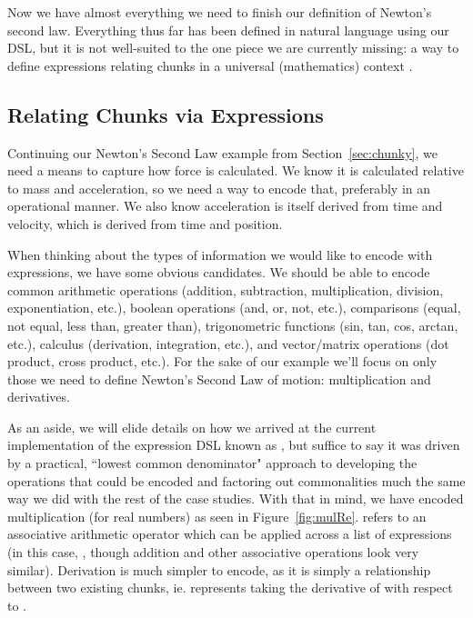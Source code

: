 Now we have almost everything we need to finish our definition of Newton's 
second law. Everything thus far has been defined in natural language using our 
 DSL, but it is not well-suited to the one piece we are 
currently missing: a way to define expressions relating chunks in a universal 
 (mathematics) context .

\subsection{Relating Chunks via Expressions}
\label{sec:expr}

Continuing our Newton's Second Law example from Section~\ref{sec:chunky}, we 
need a means to capture how force is calculated. We know it is calculated 
relative to mass and acceleration, so we need a way to encode that, preferably 
in an operational manner. We also know acceleration is itself derived from 
time and velocity, which is derived from time and position.

When thinking about the types of information we would like to encode with 
expressions, we have some obvious candidates. We should be able to encode 
common arithmetic operations (addition, subtraction, multiplication, division, 
exponentiation, etc.), boolean operations (and, or, not, etc.), comparisons 
(equal, not equal, less than, greater than), trigonometric functions (sin, tan, 
cos, arctan, etc.), calculus (derivation, integration, etc.), and vector/matrix 
operations (dot product, cross product, etc.). For the sake of our example 
we'll focus on only those we need to define Newton's Second Law of motion: 
multiplication and derivatives.


As an aside, we will elide details on how we arrived at the current 
implementation of the expression DSL known as , but suffice to say 
it was driven by a practical, ``lowest common denominator" approach to 
developing the operations that could be encoded and factoring out commonalities 
much the same way we did with the rest of the case studies. With that in mind, 
we have encoded multiplication (for real numbers) as seen in 
Figure~\ref{fig:mulRe}.  refers to an associative arithmetic 
operator which can be applied across a list of expressions (in this case, 
, though addition and other associative operations look very 
similar). Derivation is much simpler to encode, as it is simply a relationship 
between two existing chunks, ie.  represents taking the 
derivative of  with respect to .

